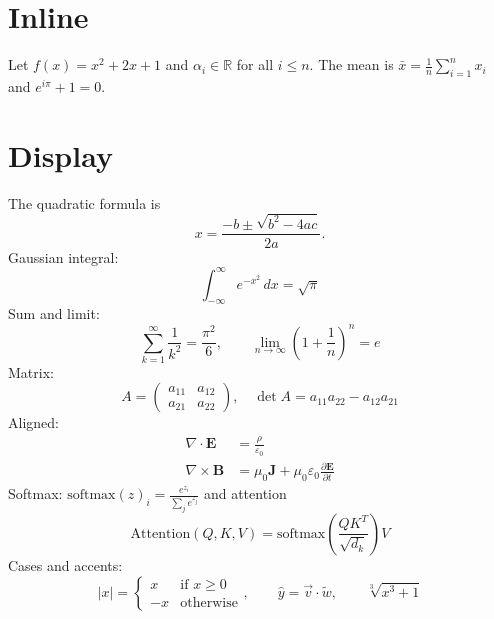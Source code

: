 \documentclass[11pt]{article}
\begin{document}
\section{Inline}
Let $f(x) = x^2 + 2x + 1$ and $\alpha_i \in \mathbb{R}$ for all $i \le n$. The mean is $\bar{x} = \frac{1}{n}\sum_{i=1}^{n} x_i$ and $e^{i\pi} + 1 = 0$.
\section{Display}
The quadratic formula is
\begin{equation}
x = \frac{-b \pm \sqrt{b^2 - 4ac}}{2a}.
\end{equation}
Gaussian integral:
\[
\int_{-\infty}^{\infty} e^{-x^2}\,dx = \sqrt{\pi}
\]
Sum and limit:
\begin{equation}
\sum_{k=1}^{\infty} \frac{1}{k^2} = \frac{\pi^2}{6}, \qquad \lim_{n\to\infty}\left(1+\frac{1}{n}\right)^n = e
\end{equation}
Matrix:
\[
A = \begin{pmatrix} a_{11} & a_{12} \\ a_{21} & a_{22} \end{pmatrix}, \quad \det A = a_{11}a_{22} - a_{12}a_{21}
\]
Aligned:
\begin{align}
\nabla \cdot \mathbf{E} &= \frac{\rho}{\varepsilon_0} \\
\nabla \times \mathbf{B} &= \mu_0 \mathbf{J} + \mu_0\varepsilon_0 \frac{\partial \mathbf{E}}{\partial t}
\end{align}
Softmax: $\mathrm{softmax}(z)_i = \frac{e^{z_i}}{\sum_j e^{z_j}}$ and attention
\[
\mathrm{Attention}(Q,K,V) = \mathrm{softmax}\left(\frac{QK^T}{\sqrt{d_k}}\right)V
\]
Cases and accents:
\[
|x| = \begin{cases} x & \text{if } x \ge 0 \\ -x & \text{otherwise} \end{cases}, \qquad \hat{y} = \vec{v} \cdot \tilde{w}, \qquad \sqrt[3]{x^3 + 1}
\]
\end{document}
